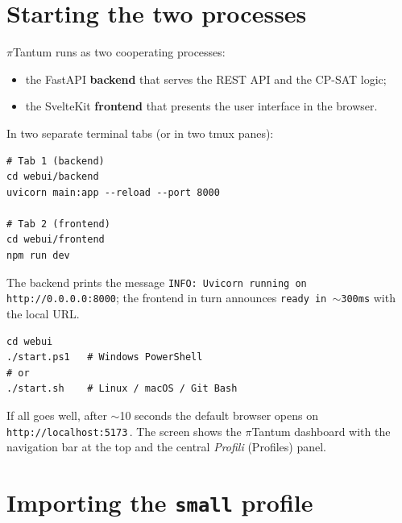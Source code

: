 \section{Starting the two processes}


$\pi$Tantum runs as two cooperating processes:

\begin{itemize}
\item the FastAPI \textbf{backend} that serves the REST API and
  the CP-SAT logic;
\item the SvelteKit \textbf{frontend} that presents the user
  interface in the browser.
\end{itemize}

In two separate terminal tabs (or in two tmux panes):

\begin{lstlisting}[style=shell]
# Tab 1 (backend)
cd webui/backend
uvicorn main:app --reload --port 8000

# Tab 2 (frontend)
cd webui/frontend
npm run dev
\end{lstlisting}

The backend prints the message
\texttt{INFO: Uvicorn running on http://0.0.0.0:8000}; the
frontend in turn announces
\texttt{ready in $\sim$300ms} with the local URL.


\begin{esempiobox}[title=Try it now]
\begin{lstlisting}[style=shell]
cd webui
./start.ps1   # Windows PowerShell
# or
./start.sh    # Linux / macOS / Git Bash
\end{lstlisting}
If all goes well, after $\sim$10 seconds the default browser
opens on \texttt{http://localhost:5173}\,. The screen shows the
$\pi$Tantum dashboard with the navigation bar at the top and the
central \emph{Profili} (Profiles) panel.
\end{esempiobox}

\section{Importing the \texttt{small} profile}

